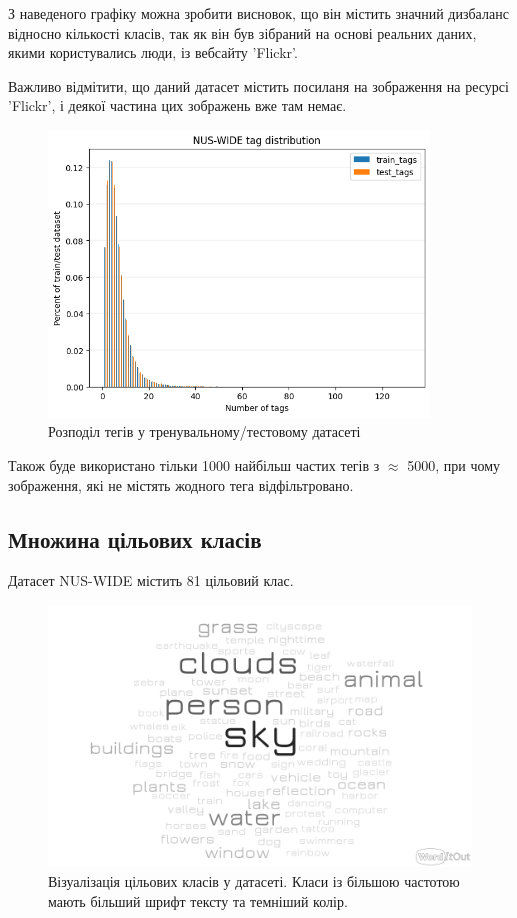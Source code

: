 \documentclass{udstu}
\begin{document}
З наведеного графіку можна зробити висновок, що він містить значний дизбаланс відносно кількості класів,
так як він був зібраний на основі реальних даних, якими користувались люди, із вебсайту 'Flickr'.

Важливо відмітити, що даний датасет містить посиланя на зображення на ресурсі 'Flickr', і деякої частина цих
зображень вже там немає.

\begin{figure}[!ht]
	\centering
	\includegraphics[width=0.9\textwidth]{PNG/nus-wide-tag-dist}
	\caption{Розподіл тегів у тренувальному/тестовому датасеті}
	\label{figure:nus-wide-dist}
\end{figure}

Також буде використано тільки 1000 найбільш частих тегів з $\approx$ 5000,
при чому зображення, які не містять жодного тега відфільтровано.

\clearpage

\subsection{Множина цільових класів}

Датасет NUS-WIDE \cite{nus-wide-civr09} містить 81 цільовий клас.

\begin{figure}[!ht]
	\centering
	\includegraphics[width=1.0\textwidth]{PNG/nus-wide-label-cloudmap}
	\caption{
	Візуалізація цільових класів у датасеті.
	Класи із більшою частотою мають більший шрифт тексту
	та темніший колір.
	}
	\label{figure:nus-wide-label-cloudmap}
\end{figure}
\end{document}
